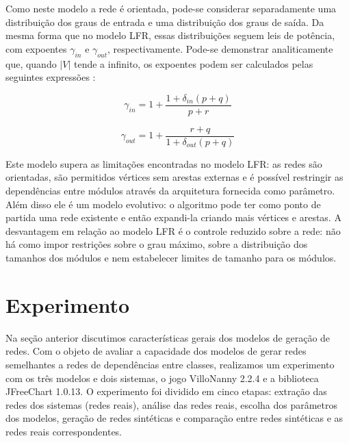 \documentclass{acm_proc_article-sp}
\begin{document}
Como neste modelo a rede é orientada, pode-se considerar separadamente uma distribuição dos graus de entrada e uma distribuição dos graus de saída. Da mesma forma que no modelo LFR, essas distribuições seguem leis de potência, com expoentes $\gamma_{in}$ e $\gamma_{out}$, respectivamente. Pode-se demonstrar analiticamente que, quando $|V|$ tende a infinito, os expoentes podem ser calculados pelas seguintes expressões \cite{Bollobas2003}:

\begin{equation}
\gamma_{in} = 1 + \frac{1 + \delta_{in}(p + q)}{p + r}
\end{equation}

\begin{equation}
\gamma_{out} = 1 + \frac{r + q}{1 + \delta_{out}(p + q)}
\end{equation}


Este modelo supera as limitações encontradas no modelo LFR: as redes são orientadas, são permitidos vértices sem arestas externas e é possível restringir as dependências entre módulos através da arquitetura fornecida como parâmetro. Além disso ele é um modelo evolutivo: o algoritmo pode ter como ponto de partida uma rede existente e então expandi-la criando mais vértices e arestas. A desvantagem em relação ao modelo LFR é o controle reduzido sobre a rede: não há como impor restrições sobre o grau máximo, sobre a distribuição dos tamanhos dos módulos e nem estabelecer limites de tamanho para os módulos.


\section{Experimento} \label{sec:experimento}

Na seção anterior discutimos características gerais dos modelos de geração de redes. Com o objeto de avaliar a capacidade dos modelos de gerar redes semelhantes a redes de dependências entre classes, realizamos um experimento com os três modelos e dois sistemas, o jogo VilloNanny 2.2.4 e a biblioteca JFreeChart 1.0.13. O experimento foi dividido em cinco etapas: extração das redes dos sistemas (redes reais), análise das redes reais, escolha dos parâmetros dos modelos, geração de redes sintéticas e comparação entre redes sintéticas e as redes reais correspondentes. 
\end{document}
